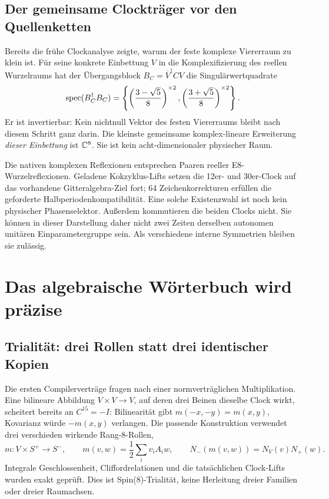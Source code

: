 \section{Der gemeinsame Clockträger vor den Quellenketten}
Bereits die frühe Clockanalyse zeigte, warum der feste komplexe Viererraum zu klein ist. Für seine konkrete Einbettung $V$ in die Komplexifizierung des reellen Wurzelraums hat der Übergangsblock $B_C=\overline V^{\dagger}CV$ die Singulärwertquadrate
\[
 \operatorname{spec}(B_C^\dagger B_C)=
 \left\{\left(\frac{3-\sqrt5}{8}\right)^{\times2},
 \left(\frac{3+\sqrt5}{8}\right)^{\times2}\right\}.
\]
Er ist invertierbar: Kein nichtnull Vektor des festen Viererraums bleibt nach diesem Schritt ganz darin. Die kleinste gemeinsame komplex-lineare Erweiterung \emph{dieser Einbettung} ist $\mathbb C^8$. Sie ist kein acht-dimensionaler physischer Raum. 

Die nativen komplexen Reflexionen entsprechen Paaren reeller E8-Wurzelreflexionen. Geladene Kokzyklus-Lifts setzen die 12er- und 30er-Clock auf das vorhandene Gitteralgebra-Ziel fort; 64 Zeichenkorrekturen erfüllen die geforderte Halbperiodenkompatibilität. Eine solche Existenzwahl ist noch kein physischer Phasenselektor. Außerdem kommutieren die beiden Clocks nicht. Sie können in dieser Darstellung daher nicht zwei Zeiten derselben autonomen unitären Einparametergruppe sein. Als verschiedene interne Symmetrien bleiben sie zulässig. 

\chapter{Das algebraische Wörterbuch wird präzise}
\section{Trialität: drei Rollen statt drei identischer Kopien}
Die ersten Compilerverträge fragen nach einer normverträglichen Multiplikation. Eine bilineare Abbildung $V\times V\to V$, auf deren drei Beinen dieselbe Clock wirkt, scheitert bereits an $C^{15}=-I$: Bilinearität gibt $m(-x,-y)=m(x,y)$, Kovarianz würde $-m(x,y)$ verlangen. Die passende Konstruktion verwendet drei verschieden wirkende Rang-8-Rollen,
\[
 m:V\times S^+\longrightarrow S^-,\qquad
 m(v,w)=\frac12\sum_i v_iA_iw,
 \qquad N_-(m(v,w))=N_V(v)N_+(w).
\]
Integrale Geschlossenheit, Cliffordrelationen und die tatsächlichen Clock-Lifts wurden exakt geprüft. Dies ist Spin(8)-Trialität, keine Herleitung dreier Familien oder dreier Raumachsen. 

